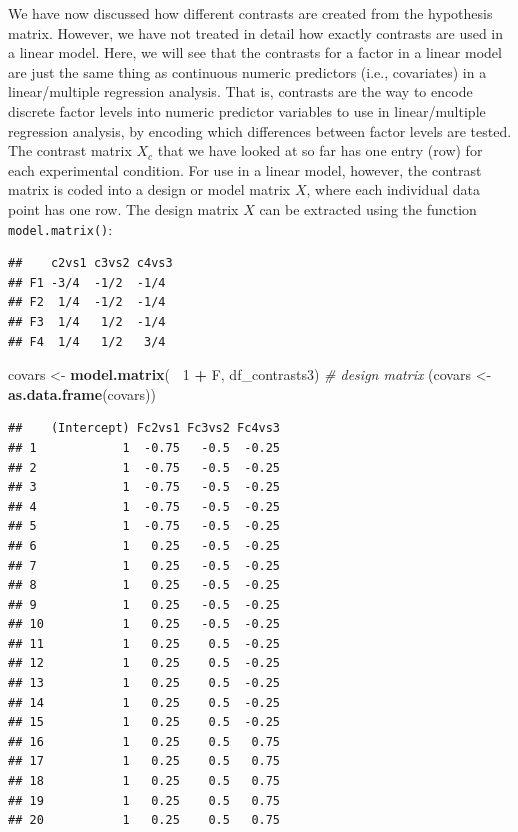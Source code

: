 \documentclass[12pt,]{krantz}
\newenvironment{Shaded}{\begin{snugshade}}{\end{snugshade}}
\newcommand{\CommentTok}[1]{\textcolor[rgb]{0.56,0.35,0.01}{\textit{#1}}}
\newcommand{\DecValTok}[1]{\textcolor[rgb]{0.00,0.00,0.81}{#1}}
\newcommand{\KeywordTok}[1]{\textcolor[rgb]{0.13,0.29,0.53}{\textbf{#1}}}
\newcommand{\NormalTok}[1]{#1}
\newcommand{\OperatorTok}[1]{\textcolor[rgb]{0.81,0.36,0.00}{\textbf{#1}}}
\newcommand{\StringTok}[1]{\textcolor[rgb]{0.31,0.60,0.02}{#1}}
\begin{document}
We have now discussed how different contrasts are created from the hypothesis matrix. However, we have not treated in detail how exactly contrasts are used in a linear model. Here, we will see that the contrasts for a factor in a linear model are just the same thing as continuous numeric predictors (i.e., covariates) in a linear/multiple regression analysis. That is, contrasts are the way to encode discrete factor levels into numeric predictor variables to use in linear/multiple regression analysis, by encoding which differences between factor levels are tested.
The contrast matrix \(X_c\) that we have looked at so far has one entry (row) for each experimental condition. For use in a linear model, however, the contrast matrix is coded into a design or model matrix \(X\), where each individual data point has one row. The design matrix \(X\) can be extracted using the function \texttt{model.matrix()}:

\begin{Shaded}
\end{Shaded}

\begin{verbatim}
##    c2vs1 c3vs2 c4vs3
## F1 -3/4  -1/2  -1/4 
## F2  1/4  -1/2  -1/4 
## F3  1/4   1/2  -1/4 
## F4  1/4   1/2   3/4
\end{verbatim}

\begin{Shaded}
\begin{Highlighting}[]
\NormalTok{covars <-}\StringTok{ }\KeywordTok{model.matrix}\NormalTok{(}\OperatorTok{~}\StringTok{ }\DecValTok{1} \OperatorTok{+}\StringTok{ }\NormalTok{F, df_contrasts3) }\CommentTok{# design matrix}
\NormalTok{(covars <-}\StringTok{ }\KeywordTok{as.data.frame}\NormalTok{(covars))}
\end{Highlighting}
\end{Shaded}

\begin{verbatim}
##    (Intercept) Fc2vs1 Fc3vs2 Fc4vs3
## 1            1  -0.75   -0.5  -0.25
## 2            1  -0.75   -0.5  -0.25
## 3            1  -0.75   -0.5  -0.25
## 4            1  -0.75   -0.5  -0.25
## 5            1  -0.75   -0.5  -0.25
## 6            1   0.25   -0.5  -0.25
## 7            1   0.25   -0.5  -0.25
## 8            1   0.25   -0.5  -0.25
## 9            1   0.25   -0.5  -0.25
## 10           1   0.25   -0.5  -0.25
## 11           1   0.25    0.5  -0.25
## 12           1   0.25    0.5  -0.25
## 13           1   0.25    0.5  -0.25
## 14           1   0.25    0.5  -0.25
## 15           1   0.25    0.5  -0.25
## 16           1   0.25    0.5   0.75
## 17           1   0.25    0.5   0.75
## 18           1   0.25    0.5   0.75
## 19           1   0.25    0.5   0.75
## 20           1   0.25    0.5   0.75
\end{verbatim}
\end{document}
